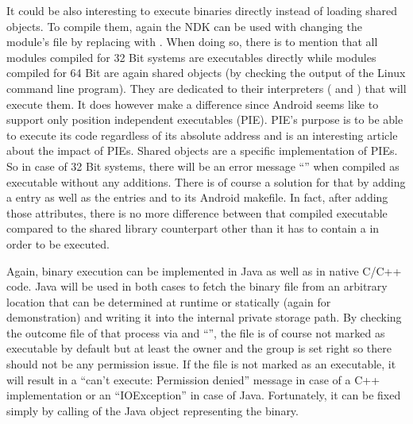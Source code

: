 It could be also interesting to execute binaries directly instead of loading shared objects. To compile them, again the NDK can be used with changing the module's
 file by replacing  with 
. When doing so, there is to mention 
that all modules compiled for 32 Bit systems are executables directly while modules
compiled for 64 Bit are again shared objects (by checking the output of the Linux
 command line program).
They are dedicated to their interpreters ( and ) that will execute them. It does however make a difference since
Android seems like to support only position independent executables (PIE).
PIE's purpose is to be able to execute its code regardless of its absolute address
and \parencite{pie} is an interesting article about the impact of PIEs.
Shared objects are a specific implementation of PIEs. So in case of 32 Bit systems, there will be an error message 
``'' when
compiled as executable without any additions. There is of course a solution for that
by adding a  entry  as well as the 
entries  and  to its Android makefile. In fact, after adding
those attributes, there is no more difference between that compiled executable 
compared to the shared library counterpart other than it has to contain a
 in order to be executed. 

Again, binary execution can be implemented in Java as well as in native C/C++ code.
Java will be used in both cases to fetch the binary file from an arbitrary location that can be determined at runtime or statically (again  
for demonstration) and writing it into the internal private storage path. By checking the outcome file of that process via  and ``'', the file is of course not marked as executable by default but at least the owner and the group is set right so there
should not be any permission issue.
If the file is not marked as an executable, it will result in a ``can't execute: Permission denied'' message in case of a C++ implementation or an ``IOException'' in case of Java. Fortunately, it can be fixed simply by calling 
of the Java  object representing the binary. 

